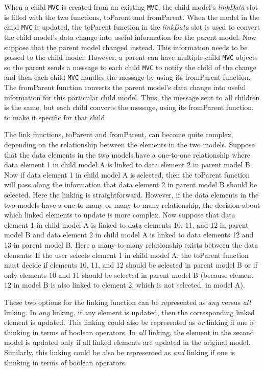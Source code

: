 \documentclass{article}[11pt]
\newcommand{\Rfunction}[1]{{\textsf{#1}}}
\newcommand{\Robject}[1]{{\texttt{#1}}}
\newcommand{\Rslot}[1]{\textsl{#1}}
\begin{document}
When a child \Robject{MVC} is created from an existing \Robject{MVC}, the
child model's \Rslot{linkData} slot is filled with the two functions,
\Rfunction{toParent} and \Rfunction{fromParent}.  When the model in
the child \Robject{MVC} is updated, the \Rfunction{toParent} function in the
\Rslot{linkData} slot is used to convert the child model's data
change into useful information for the parent model.  
Now suppose that the parent model changed instead.  This information
needs to be passed to the child model.  However, a parent can have
multiple child \Robject{MVC} objects so the parent sends a message to each
child \Robject{MVC} to notify the child of the change and then each child
\Robject{MVC} handles the message by using its \Rfunction{fromParent}
function.  The \Rfunction{fromParent} function converts the parent
model's data change into useful information for this
particular child model.  Thus, the message sent to all children is the
same, but each child converts the message, using its \Rfunction{fromParent}
function, to make it specific for that child.

The link functions, \Rfunction{toParent} and \Rfunction{fromParent}, can
become quite complex depending on the relationship between the elements in the
two models.  Suppose that the data elements in the two models have a
one-to-one relationship where data element 1 in child model A is linked to
data element 2 in parent model B.  Now if data element 1 in child model A is
selected, then the \Rfunction{toParent} function will pass along the
information that data element 2 in parent model B should be selected.  Here
the linking is straightforward.  However, if the data elements in the two
models have a one-to-many or many-to-many relationship, the decision about
which linked elements to update is more complex.  Now suppose that data
element 1 in child model A is linked to data elements 10, 11, and 12 in parent
model B and data element 2 in child model A is linked to data elements 12 and
13 in parent model B.  Here a many-to-many relationship exists between the
data elements.  If the user selects element 1 in child model A, the
\Rfunction{toParent} function must decide if elements 10, 11, and 12 should be
selected in parent model B or if only elements 10 and 11 should be selected in
parent model B (because element 12 in model B is also linked to element 2,
which is not selected, in model A).  

These two options for the linking function can be represented as \textit{any}
versus \textit{all} linking.  In \textit{any} linking, if any element is
updated, then the corresponding linked element is updated.  This linking could
also be represented as \textit{or} linking if one is thinking in terms of
boolean operators.  In \textit{all} linking, the element in the second model
is updated only if all linked elements are updated in the original model.
Similarly, this linking could be also be represented as \textit{and} linking
if one is thinking in terms of boolean operators.  
\end{document}
